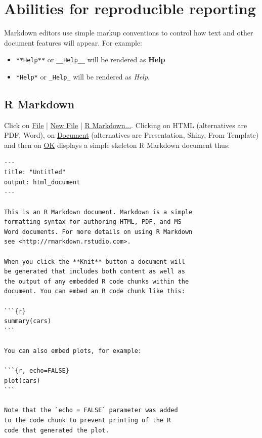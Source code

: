 \documentclass{tufte-book}\usepackage[]{graphicx}\usepackage[]{color}
\newcommand{\txtt}[1]{\texttt{#1}}
\begin{document}
\section{Abilities for reproducible reporting}
Markdown editors use simple markup conventions to control how text and
other document features will appear.  For example:
\begin{itemize}
\item[] \txtt{**Help**} or \txtt{\_\_Help\_\_} will be rendered as
\textbf{Help}
\item[] \txtt{*Help*} or \txtt{\_Help\_} will be rendered as {\em Help}.
\end{itemize}

\subsection{R Markdown}

Click on \underline{File} | \underline{New File} | \underline{R
  Markdown...}.  Clicking on HTML (alternatives are PDF, Word), on
\underline{Document} (alternatives are Presentation, Shiny, From
Template) and then on \underline{OK} displays a simple skeleton R
Markdown document thus:
\begin{verbatim}
---
title: "Untitled"
output: html_document
---

This is an R Markdown document. Markdown is a simple
formatting syntax for authoring HTML, PDF, and MS
Word documents. For more details on using R Markdown
see <http://rmarkdown.rstudio.com>.

When you click the **Knit** button a document will
be generated that includes both content as well as
the output of any embedded R code chunks within the
document. You can embed an R code chunk like this:

```{r}
summary(cars)
```

You can also embed plots, for example:

```{r, echo=FALSE}
plot(cars)
```

Note that the `echo = FALSE` parameter was added
to the code chunk to prevent printing of the R
code that generated the plot.
\end{verbatim}
\end{document}

